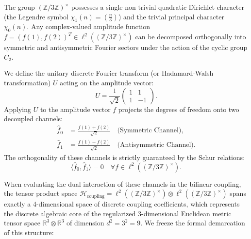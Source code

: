 \documentclass[11pt,a4paper]{article}
\theoremstyle{definition}
\begin{document}
	The group $(\mathbb{Z}/3\mathbb{Z})^\times$ possesses a single non-trivial quadratic Dirichlet character (the Legendre symbol $\chi_1(n) = \left(\frac{n}{3}\right)$) and the trivial principal character $\chi_0(n)$. Any complex-valued amplitude function $f = (f(1), f(2))^T \in \ell^2((\mathbb{Z}/3\mathbb{Z})^\times)$ can be decomposed orthogonally into symmetric and antisymmetric Fourier sectors under the action of the cyclic group $C_2$.
	
	We define the unitary discrete Fourier transform (or Hadamard-Walsh transformation) $U$ acting on the amplitude vector:
	\begin{equation}
		U = \frac{1}{\sqrt{2}} \begin{pmatrix} 1 & 1 \\ 1 & -1 \end{pmatrix}.
	\end{equation}
	Applying $U$ to the amplitude vector $f$ projects the degrees of freedom onto two decoupled channels:
	\begin{align}
		\widehat{f}_0 &= \frac{f(1) + f(2)}{\sqrt{2}} \quad \text{(Symmetric Channel)}, \\
		\widehat{f}_1 &= \frac{f(1) - f(2)}{\sqrt{2}} \quad \text{(Antisymmetric Channel)}.
	\end{align}
	The orthogonality of these channels is strictly guaranteed by the Schur relations:
	\begin{equation}
		\langle \widehat{f}_0, \widehat{f}_1 \rangle = 0 \quad \forall f \in \ell^2((\mathbb{Z}/3\mathbb{Z})^\times).
	\end{equation}
	
	When evaluating the dual interaction of these channels in the bilinear coupling, the tensor product space $\mathcal{H}_{\text{coupling}} = \ell^2((\mathbb{Z}/3\mathbb{Z})^\times) \otimes \ell^2((\mathbb{Z}/3\mathbb{Z})^\times)$ spans exactly a 4-dimensional space of discrete coupling coefficients, which represents the discrete algebraic core of the regularized 3-dimensional Euclidean metric tensor space $\mathbb{R}^3 \otimes \mathbb{R}^3$ of dimension $d^2 = 3^2 = 9$. We freeze the formal demarcation of this structure:
	
\end{document}
